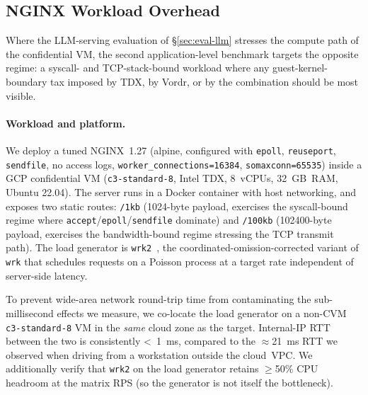 
\subsection{NGINX Workload Overhead}
\label{sec:eval-nginx}

Where the LLM-serving evaluation of \S\ref{sec:eval-llm} stresses the
compute path of the confidential VM, the second application-level
benchmark targets the opposite regime: a syscall- and TCP-stack-bound
workload where any guest-kernel-boundary tax imposed by TDX, by Vordr,
or by the combination should be most visible.

\paragraph{Workload and platform.}
We deploy a tuned NGINX~1.27 (alpine, configured with
\texttt{epoll}, \texttt{reuseport}, \texttt{sendfile}, no access logs,
\texttt{worker\_connections=16384}, \texttt{somaxconn=65535}) inside a
GCP confidential VM (\texttt{c3-standard-8}, Intel TDX, 8~vCPUs,
32~GB~RAM, Ubuntu 22.04). The server runs in a Docker container with
host networking, and exposes two static routes:
\texttt{/1kb} (1024-byte payload, exercises the syscall-bound regime
where \texttt{accept}/\texttt{epoll}/\texttt{sendfile} dominate) and
\texttt{/100kb} (102400-byte payload, exercises the bandwidth-bound
regime stressing the TCP transmit path). The load generator is
\texttt{wrk2}~\cite{wrk2}, the coordinated-omission-corrected variant
of \texttt{wrk} that schedules requests on a Poisson process at a
target rate independent of server-side latency.

To prevent wide-area network round-trip time from contaminating the
sub-millisecond effects we measure, we co-locate the load generator on
a non-CVM \texttt{c3-standard-8} VM in the \emph{same} cloud zone as
the target. Internal-IP RTT between the two is consistently
\textless~1~ms, compared to the $\approx$21~ms RTT we observed when
driving from a workstation outside the cloud~VPC. We additionally
verify that \texttt{wrk2} on the load generator retains $\geq$50\%
CPU headroom at the matrix RPS (so the generator is not itself the
bottleneck).

